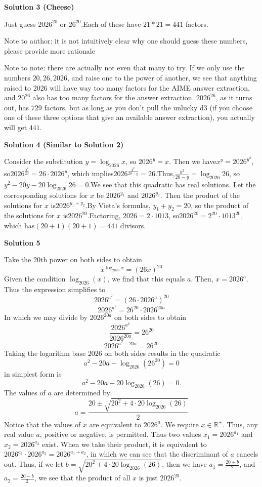 \begin{enumerate}
 



\textbf{Solution 3 (Cheese)}

Just guess $2026^{20}$ or $26^{20}$.Each of these have  $21 * 21 = \boxed{441}$ factors.

 Note to author: it is not intuitively clear why one should guess these numbers, please provide more rationale

 Note to note: there are actually not even that many to try. If we only use the numbers $20,26, 2026$, and raise one to the power of another, we see that anything raised to $2026$ will have way too many factors for the AIME answer extraction, and $20^{26}$ also has too many factors for the answer extraction. $2026^{26}$, as it turns out, has $729$ factors, but as long as you don't pull the unlucky d3 (if you choose one of these three options that give an available answer extraction), you actually will get $441$. 

 



\textbf{Solution 4 (Similar to Solution 2)}

Consider the substitution $y=\log_{2026} x$, so $2026^y=x$. Then we have$x^y=2026^{y^2}$, so$2026^{\frac{y^2}{20}}=26\cdot 2026^y$, which implies$2026^{\frac{y^2}{20-y}}=26$.Thus,$\frac{y^2}{20-y}=\log_{2026} 26$, so$y^2-20y-20\log_{2026} 26=0$.We see that this quadratic has real solutions. Let the corresponding solutions for $x$ be $2026^{y_1}$ and $2026^{y_2}$. Then the product of the solutions for $x$ is$2026^{y_1+y_2}$.By Vieta’s formulas, $y_1+y_2=20$, so the product of the solutions for $x$ is$2026^{20}$.Factoring, $2026=2\cdot 1013$, so$2026^{20}=2^{20}\cdot 1013^{20}$, which has$(20+1)(20+1)=441$ divisors.

 



\textbf{Solution 5}

Take the 20th power on both sides to obtain
 \[x^{\log_{2026}x} = (26x)^{20}\]Given the condition $\log_{2026}(x)$, we find that this equals $a$. Then, $x = 2026^a$. Thus the expression simplifies to
 \[2026^{a^2} = (26 \cdot 2026^a)^{20}\]
 \[2026^{a^2} = 26^{20} \cdot 2026^{20a}\]In which we may divide by $2026^{20a}$ on both sides to obtain
 \[\frac{2026^{a^2}}{2026^{20a}} = 26^{20}\]
 \[2026^{a^2 - 20a} = 26^{20}\]Taking the logarithm base $2026$ on both sides results in the quadratic
 \[a^2 - 20a - \log_{2026}(26^{20}) = 0\]in simplest form is
 \[a^2 - 20a - 20 \log_{2026}(26) = 0.\]The values of $a$ are determined by
 \[a = \frac{20 \pm \sqrt{20^2 + 4 \cdot 20 \log_{2026}(26)}}{2}\]Notice that the values of $x$ are equivalent to $2026^a$. We require $x \in \mathbb{R}^+$. Thus, any real value $a$, positive or negative, is permitted. Thus two values $x_1 = 2026^{a_1}$ and $x_2 = 2026^{a_2}$ exist. When we take their product, it is equivalent to $2026^{a_1} \cdot 2026^{a_2} = 2026^{a_1+a_2}$, in which we can see that the discriminant of $a$ cancels out. Thus, if we let $b = \sqrt{20^2 + 4 \cdot 20 \log_{2026}(26)}$, then we have $a_1 = \frac{20 + b}{2}$, and $a_2 = \frac{20 - b}{2}$, we see that the product of all $x$ is just $2026^{20}$.


\end{enumerate}
